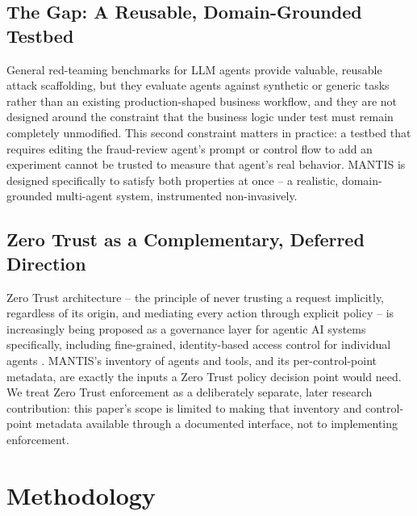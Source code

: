 \documentclass[conference]{IEEEtran}
\begin{document}
\subsection{The Gap: A Reusable, Domain-Grounded Testbed}
General red-teaming benchmarks for LLM agents \cite{redagentbench} provide valuable, reusable attack scaffolding, but they evaluate agents against synthetic or generic tasks rather than an existing production-shaped business workflow, and they are not designed around the constraint that the business logic under test must remain completely unmodified. This second constraint matters in practice: a testbed that requires editing the fraud-review agent's prompt or control flow to add an experiment cannot be trusted to measure that agent's real behavior. MANTIS is designed specifically to satisfy both properties at once -- a realistic, domain-grounded multi-agent system, instrumented non-invasively.

\subsection{Zero Trust as a Complementary, Deferred Direction}
Zero Trust architecture -- the principle of never trusting a request implicitly, regardless of its origin, and mediating every action through explicit policy \cite{nist_zero_trust} -- is increasingly being proposed as a governance layer for agentic AI systems specifically, including fine-grained, identity-based access control for individual agents \cite{zero_trust_agentic_identity}. MANTIS's inventory of agents and tools, and its per-control-point metadata, are exactly the inputs a Zero Trust policy decision point would need. We treat Zero Trust enforcement as a deliberately separate, later research contribution: this paper's scope is limited to making that inventory and control-point metadata available through a documented interface, not to implementing enforcement.

\section{Methodology}
\end{document}
